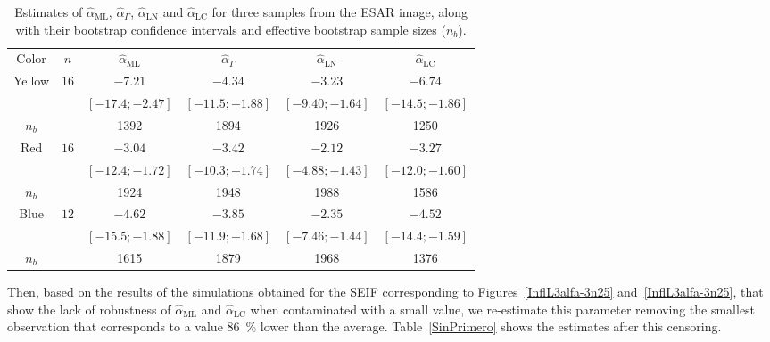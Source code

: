 \documentclass[twocolumn]{svjour3}
\begin{document}
	\begin{table}[hbt]
		\centering
		\caption{Estimates of $\widehat{\alpha}_{\text{{ML}}}$, $\widehat{\alpha}_{\Gamma}$, $\widehat{\alpha}_{\text{{LN}}}$ and $\widehat{\alpha}_{\text{{LC}}}$ for three samples from the ESAR image, along with their bootstrap confidence intervals and effective bootstrap sample sizes ($n_b$).}\label{TablaTresMuestras}
		\begin{tabular}{c*5{c}}
			\toprule
			Color       &  $n$    &  $\widehat{\alpha}_{\text{{ML}}}$    &  $\widehat{\alpha}_{\Gamma}$  &  $\widehat{\alpha}_{\text{{LN}}}$ &  $\widehat{\alpha}_{\text{{LC}}}$\\
			\cmidrule(lr){1-6}
			Yellow      & $16$  & $-7.21$ & $-4.34$ & $-3.23$ & $-6.74$\\
			&	& $[-17.4;-2.47]$ & $[-11.5;-1.88]$ & $[-9.40;-1.64]$ & $[-14.5;-1.86]$\\
			$n_{b}$    	& & 1392          & 1894          & 1926          &  1250        \\ \midrule
			Red         & $16$  & $-3.04$ & $-3.42$ & $-2.12$ & $-3.27$\\
			& & $[-12.4;-1.72]$ & $[-10.3;-1.74]$ & $[-4.88;-1.43]$ & $[-12.0;-1.60]$\\
			$n_{b}$    	& & 1924          & 1948          & 1988          & 1586         \\ \midrule
			Blue        & $12$  & $-4.62$ & $-3.85$ & $-2.35$ & $-4.52$\\
			& & $[-15.5;-1.88]$ & $[-11.9;-1.68]$ & $[-7.46;-1.44]$ & $[-14.4;-1.59]$\\
			$n_{b}$    & & 1615          & 1879          & 1968          & 1376         \\
			\bottomrule
		\end{tabular}
	\end{table} 
	
	

	Then, based on the results of the simulations obtained for the SEIF corresponding to Figures~\ref{InflL3alfa-3n25} and~\ref{InflL3alfa-3n25}, that show the lack of robustness of $\widehat{\alpha}_{\text{{ML}}}$ and $\widehat{\alpha}_{\text{{LC}}}$ when contaminated with a small value, we re-estimate this parameter removing the smallest observation that corresponds to a value \SI{86}{\percent} lower than the average. 
	Table~\ref{SinPrimero} shows the estimates after this censoring.
	
\end{document}
